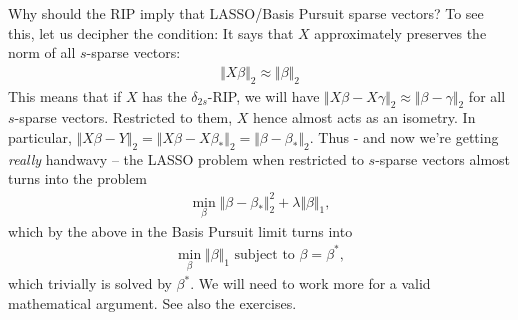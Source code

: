 \documentclass{article}
\newcommand{\norm}[1]{\Vert #1 \Vert}
\begin{document}
Why should the RIP imply that LASSO/Basis Pursuit sparse vectors? To see this, let us decipher the condition: It says that $X$ approximately preserves the norm of all $s$-sparse vectors:
\begin{align*}
    \norm{X\beta}_2 \approx \norm{\beta}_2
\end{align*}
This means that if $X$ has the $\delta_{2s}$-RIP, we will have $\norm{X\beta-X\gamma}_2\approx \norm{\beta-\gamma}_2$ for all $s$-sparse vectors. Restricted to them, $X$ hence almost acts as an isometry. In particular, $\norm{X\beta-Y}_2 = \norm{X\beta-X\beta_*}_2 = \norm{\beta-\beta_*}_2$. Thus - and now we're getting \emph{really} handwavy -- the LASSO problem when restricted to $s$-sparse vectors almost turns into the problem
\begin{align} \label{eq:prox}
    \min_\beta \norm{\beta-\beta_*}_2^2 + \lambda \norm{\beta}_1,
\end{align}
which by the above in the Basis Pursuit limit turns into
\begin{align*}
    \min_\beta \norm{\beta}_1 \text{ subject to } \beta=\beta^*,
\end{align*}
which trivially is solved by $\beta^*$. We will need to work more for a valid mathematical argument. See also the exercises.
\end{document}
